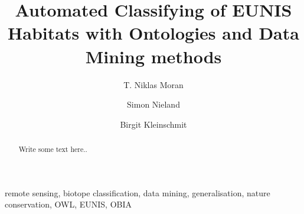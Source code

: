 \documentclass[authoryear, review,12pt,number]{elsarticle}
\begin{document}
\begin{frontmatter}
\linenumbers
\title{Automated Classifying of EUNIS Habitats with Ontologies and Data Mining
methods}


\author[TUB]{T. Niklas Moran}

\author[TUB]{Simon Nieland}
\author[TUB]{Birgit Kleinschmit}


\address[TUB]{Geoinformation in Environmental Planning Lab, Technische
Universit\"at Berlin, Stra\ss e des 17. Juni 145, 10623 Berlin, Germany}


\begin{abstract}
Write some text here..
\end{abstract}

\begin{keyword}
remote sensing, biotope classification, data mining,
generalisation, nature conservation, OWL, EUNIS, OBIA
\end{keyword}

\end{frontmatter}

\linenumbers
\end{document}
